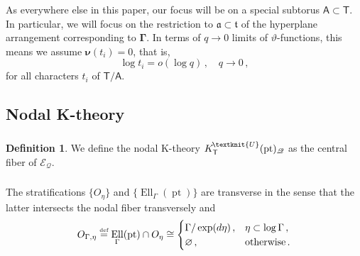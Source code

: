 \documentclass[14pt]{extarticle}
\newcommand{\Kn}{K^{\! \tiny\textknit{U}}}
\newcommand{\bT}{\mathsf{T}}
\newcommand{\bA}{\mathsf{A}}
\newcommand{\cQ}{\mathscr{Q}}
\newcommand{\cE}{\mathscr{E}}
\newcommand{\bGamma}{\boldsymbol{\Gamma}}
\newcommand{\ft}{\mathfrak{t}}
\newcommand{\fa}{\mathfrak{a}}
\newcommand{\bnu}{\boldsymbol \nu}
\DeclareMathOperator{\Ell}{Ell}
\DeclareMathOperator{\pt}{pt}
\theoremstyle{definition}
\newtheorem{Definition}{Definition}
\begin{document}
\subsubsection{}
As everywhere else in this paper, our focus will be on a special
subtorus $\bA \subset \bT$. In particular, we will focus on the
restriction to $\fa \subset \ft$ of the hyperplane arrangement
corresponding to $\bGamma$. In terms of $q\to 0$ limits of
$\vartheta$-functions, this means we assume $\bnu(t_i)=0$,
that is,
$$
\log t_i = o(\log q)\,,  \quad q\to 0 \,, 
$$
for all
characters $t_i$ of $\bT/\bA$. 


\subsection{Nodal K-theory}

\subsubsection{}


\begin{Definition}
   We define
the nodal K-theory $\Kn_\bT(\pt)_\cQ$ as the central fiber of
$\cE_\cQ$.
\end{Definition}

\subsubsection{}



The stratifications $\{O_{\eta}\}$ and $\{\Ell_\Gamma(\pt)\}$ are
transverse in the sense that the latter intersects
the nodal fiber transversely and 
%
\begin{equation}
O_{ \Gamma, \eta} \overset{\textup{\tiny def}}= \Ell_\Gamma(\pt)
\cap O_{\eta} \cong 
\begin{cases}
  \Gamma/\exp(d\eta)\,, &  \eta \subset \log \Gamma \,, \\
  \varnothing \,, & \textup{otherwise} \,. 
\end{cases}\label{transv}
\end{equation}
%


\subsubsection{}\label{s_defKbar0}
\end{document}
